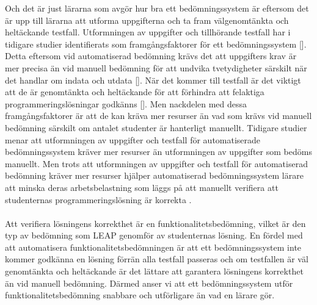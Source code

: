 \documentclass[a4paper,11pt]{article}
\begin{document}
{Och det är just lärarna som avgör hur bra ett bedömningssystem är eftersom det är upp till lärarna att utforma uppgifterna och ta fram välgenomtänkta och heltäckande testfall. Utformningen av uppgifter och tillhörande testfall har i tidigare studier identifierats som framgångsfaktorer för ett bedömningssystem []. Detta eftersom vid automatiserad bedömning krävs det att uppgifters krav är mer precisa än vid manuell bedömning för att undvika tvetydigheter särskilt när det handlar om indata och utdata []. När det kommer till testfall är det viktigt att de är genomtänkta och heltäckande för att förhindra att felaktiga programmeringslösningar godkänns []. Men nackdelen med dessa framgångsfaktorer är att de kan kräva mer resurser än vad som krävs vid manuell bedömning särskilt om antalet studenter är hanterligt manuellt. Tidigare studier \cite{ala-mutka} \cite{cinelli} menar att utformningen av uppgifter och testfall för automatiserade bedömningssystem kräver mer resurser än utformningen av uppgifter som bedöms manuellt. Men trots att utformningen av uppgifter och testfall för automatiserad bedömning kräver mer resurser hjälper automatiserad bedömningssystem lärare att minska deras arbetsbelastning som läggs på att manuellt verifiera att studenternas programmeringslösning är korrekta \cite{enstrom} .
\\
\\
Att verifiera lösningens korrekthet är en funktionalitetsbedömning,  vilket är den typ av bedömning som LEAP genomför av studenternas lösning. En fördel med att automatisera funktionalitetsbedömningen är att ett bedömningssystem inte kommer godkänna en lösning förrän alla testfall passeras och om testfallen är väl genomtänkta och heltäckande är det lättare att garantera lösningens korrekthet än vid manuell bedömning. Därmed anser vi att ett bedömningssystem utför funktionalitetsbedömning snabbare och utförligare än vad en lärare gör.
\\
\\
}
\end{document}
